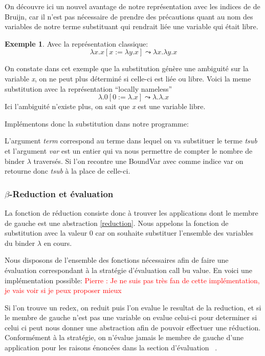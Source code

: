 \documentclass {article}
\newcommand{\codefrom}[3]
           {}
\theoremstyle{definition}
\newtheorem{example}{Exemple}
\theoremstyle{remark}
\newcommand{\todo}[1]{\textcolor{red}{#1}}
\begin{document}
On découvre ici un nouvel avantage de notre représentation avec les indices de
de Bruijn, car il n'est pas nécessaire de prendre des précautions quant au
nom des variables de notre terme substituant qui rendrait liée une variable qui était libre. 

\begin{example}
  Avec la représentation classique:
  \[ 
  \lambda x.x[x := \lambda y.x]\leadsto\lambda x.\lambda y.x
  \]
  
  On constate dans cet exemple que la substitution génère une ambiguité sur la variable \emph{x},
  on ne peut plus déterminé si celle-ci est liée ou libre.
  Voici la meme substitution avec la représentation ``locally nameless''
  \[ 
  \lambda.0[0 := \lambda.x]\leadsto\lambda.\lambda.x
  \]
  Ici l'ambiguité n'existe plus, on sait que \emph{x} est une variable libre.
\end{example}

Implémentons donc la substitution dans notre programme:

\codefrom{untyped}{lambda}{substitution}

L'argument \emph{term} correspond au terme dans lequel on va substituer le terme \emph{tsub} et 
l'argument \emph{var} est un entier qui va nous permettre de compter le nombre de binder \(\lambda\)
traversés. Si l'on recontre une BoundVar avec comme indice var on retourne donc \emph{tsub} à la 
place de celle-ci.


\subsubsection{$\beta$-Reduction et évaluation}
La fonction de réduction consiste donc à trouver les applications dont le membre 
de gauche est une abstraction \ref{reduction}.
Nous appelons la fonction de substitution  avec la
valeur \(0\) car on souhaite substituer l'ensemble des variables du binder
\(\lambda\) en cours.

\codefrom{untyped}{lambda}{reduction}

Nous disposons de l'ensemble des fonctions nécessaires afin de faire une évaluation 
correspondant à la stratégie d'évaluation call bu value. En voici une implémentation
possible: 
\todo{Pierre : Je ne suis pas très fan de cette implémentation, je vais voir si je peux proposer mieux}

\codefrom{untyped}{lambda}{evaluation}

Si l'on trouve un redex, on reduit puis l'on evalue le resultat de la reduction,
et si le membre de gauche n'est pas une variable on evalue celui-ci pour determiner
si celui ci peut nous donner une abstraction afin de pouvoir effectuer une réduction.
Conformément à la stratégie, on n'évalue jamais le membre de gauche d'une application
pour les raisons énoncées dans la section d'évaluation ~\citep{reduction:call_by_name}.
\end{document}
